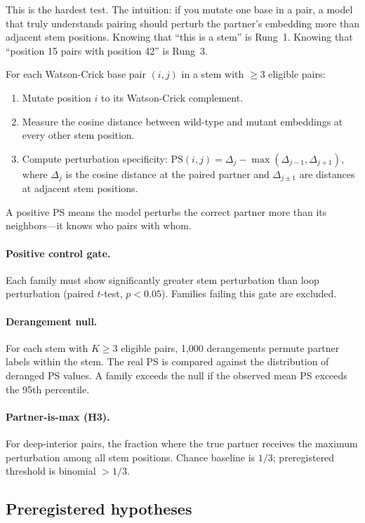 \documentclass[11pt]{article}
\begin{document}
This is the hardest test. The intuition: if you mutate one base in a
pair, a model that truly understands pairing should perturb the
partner's embedding more than adjacent stem positions. Knowing that
``this is a stem'' is Rung~1. Knowing that ``position 15 pairs with
position 42'' is Rung~3.

For each Watson-Crick base pair $(i, j)$ in a stem with $\geq 3$
eligible pairs:

\begin{enumerate}
\item Mutate position $i$ to its Watson-Crick complement.
\item Measure the cosine distance between wild-type and mutant
  embeddings at every other stem position.
\item Compute perturbation specificity:
  $\text{PS}(i, j) = \Delta_j - \max(\Delta_{j-1}, \Delta_{j+1})$,
  where $\Delta_j$ is the cosine distance at the paired partner and
  $\Delta_{j \pm 1}$ are distances at adjacent stem positions.
\end{enumerate}

A positive PS means the model perturbs the correct partner more than
its neighbors---it knows who pairs with whom.

\paragraph{Positive control gate.}
Each family must show significantly greater stem perturbation than
loop perturbation (paired $t$-test, $p < 0.05$). Families failing
this gate are excluded.

\paragraph{Derangement null.}
For each stem with $K \geq 3$ eligible pairs, 1,000 derangements
permute partner labels within the stem. The real PS is compared
against the distribution of deranged PS values. A family exceeds the
null if the observed mean PS exceeds the 95th percentile.

\paragraph{Partner-is-max (H3).}
For deep-interior pairs, the fraction where the true partner receives
the maximum perturbation among all stem positions. Chance baseline is
$1/3$; preregistered threshold is binomial $> 1/3$.

\subsection{Preregistered hypotheses}
\end{document}

